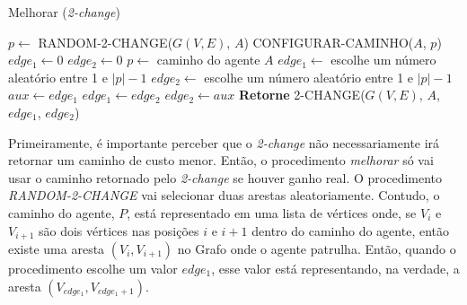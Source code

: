 \begin{algorithm}                  %
	\caption{Melhorar (\textit{2-change})}          %
	\label{melhorar}                           %
	\begin{algorithmic}[1]                    %
		\newline
		\Repeat
			\State $p \gets $ RANDOM-2-CHANGE($G(V,E)$, $A$)
				\State CONFIGURAR-CAMINHO($A$, $p$) 	
			\EndIf
		\EndProcedure
			\State $edge_{1} \gets 0$
			\State $edge_{2} \gets 0$
			\State $p \gets $ caminho do agente $A$
			\Repeat
				\State $edge_{1} \gets $ escolhe um número aleatório entre 1 e $|p| -1$
				\State $edge_{2} \gets $ escolhe um número aleatório entre 1 e $|p| -1$
				 
					\State $aux \gets edge_{1}$
					\State $edge_{1} \gets edge_{2}$
					\State $edge_{2} \gets aux$
				\EndIf
			\State \textbf{Retorne} 2-CHANGE($G(V,E)$, $A$, $edge_{1}$, $edge_{2}$) 
		\EndProcedure
	\end{algorithmic}
\end{algorithm}

Primeiramente, é importante perceber que o \textit{2-change} não necessariamente 
irá retornar um caminho de custo menor. Então, o procedimento \textit{melhorar} 
só vai usar o caminho retornado pelo \textit{2-change} se houver ganho real. O 
procedimento \textit{RANDOM-2-CHANGE} vai selecionar duas arestas aleatoriamente. 
Contudo, o caminho do agente, $P$, está representado em uma lista de vértices 
onde, se $V_{i}$ e $V_{i+1}$ são dois vértices nas posições $i$ e $i+1$ dentro do 
caminho do agente, então existe uma aresta $(V_{i}, V_{i+1})$ no Grafo onde o 
agente patrulha. Então, quando o procedimento escolhe um valor $edge_{1}$, esse 
valor está representando, na verdade, a aresta $(V_{edge_{1}}, V_{edge_{1}+1})$.

